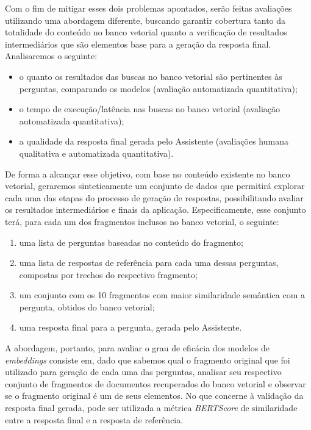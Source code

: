 Com o fim de mitigar esses dois problemas apontados, serão feitas avaliações utilizando uma abordagem diferente, buscando garantir cobertura tanto da totalidade do conteúdo no banco vetorial quanto a verificação de resultados intermediários que são elementos base para a geração da resposta final. Analisaremos o seguinte:

\begin{itemize}
    \item o quanto os resultados das buscas no banco vetorial são pertinentes às perguntas, comparando os modelos (avaliação automatizada quantitativa);
    \item o tempo de execução/latência nas buscas no banco vetorial (avaliação automatizada quantitativa);
    \item a qualidade da resposta final gerada pelo Assistente (avaliações humana qualitativa e automatizada quantitativa).
\end{itemize}

De forma a alcançar esse objetivo, com base no conteúdo existente no banco vetorial, geraremos sinteticamente um conjunto de dados que permitirá explorar cada uma das etapas do processo de geração de respostas, possibilitando avaliar os resultados intermediários e finais da aplicação. Especificamente, esse conjunto terá, para cada um dos fragmentos inclusos no banco vetorial, o seguinte:

\begin{enumerate}
    \item uma lista de perguntas baseadas no conteúdo do fragmento;
    \item uma lista de respostas de referência para cada uma dessas perguntas, compostas por trechos do respectivo fragmento;
    \item um conjunto com os 10 fragmentos com maior similaridade semântica com a pergunta, obtidos do banco vetorial;
    \item uma resposta final para a pergunta, gerada pelo Assistente.
\end{enumerate}

A abordagem, portanto, para avaliar o grau de eficácia dos modelos de \textit{embeddings} consiste em, dado que sabemos qual o fragmento original que foi utilizado para geração de cada uma das perguntas, analisar seu respectivo conjunto de fragmentos de documentos recuperados do banco vetorial e observar se o fragmento original é um de seus elementos. No que concerne à validação da resposta final gerada, pode ser utilizada a métrica \textit{BERTScore} de similaridade entre a resposta final e a resposta de referência.

